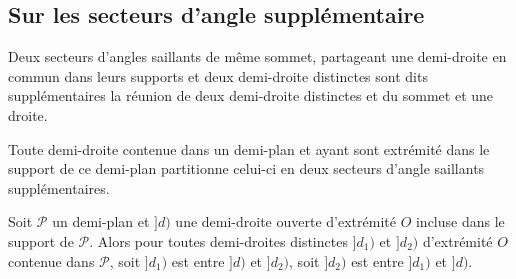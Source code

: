        \subsection{Sur les secteurs d'angle supplémentaire}

\begin{defi}\label{defi-secteurssupplementaire}
Deux secteurs d'angles saillants de même sommet, partageant une demi-droite en commun dans leurs supports et deux demi-droite distinctes sont dits supplémentaires \ssi la réunion de deux demi-droite distinctes et du sommet et une droite.
\end{defi}
\begin{prop}\label{prop-partitiondemiplan}
    Toute demi-droite contenue dans un demi-plan et ayant sont extrémité dans le support de ce demi-plan partitionne celui-ci en deux secteurs d'angle saillants supplémentaires.
\end{prop}
\begin{cor}\label{cor-B3demidroite}
    Soit $\mathcal{P}$ un demi-plan et $]d)$ une demi-droite ouverte d'extrémité $O$ incluse dans le support de $\mathcal{P}$. Alors pour toutes demi-droites distinctes $]d_1)$ et $]d_2)$ d'extrémité $O$ contenue dans $\mathcal{P}$, soit $]d_1)$ est entre $]d)$ et $]d_2)$, soit $]d_2)$ est entre $]d_1)$ et $]d)$.
\end{cor}
